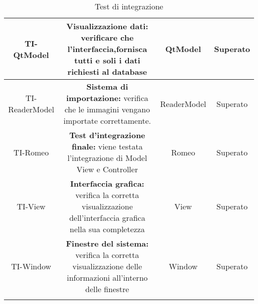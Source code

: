 \begin{center}
\begin{longtable}{|c|c|c|c|}
\hline
TI-QtModel & \parbox[t]{\larghezza}{\textbf{Visualizzazione dati:} verificare che l'interfaccia,fornisca tutti e soli i dati richiesti al database}  & QtModel & Superato \\ 
\hline
TI-ReaderModel & \parbox[t]{\larghezza}{\textbf{Sistema di importazione:} verifica che le immagini vengano importate correttamente.}  & ReaderModel & Superato \\ 
\hline
TI-Romeo & \parbox[t]{\larghezza}{\textbf {Test d'integrazione finale:} viene testata l'integrazione di Model View e Controller}  & Romeo & Superato \\ 
\hline
TI-View & \parbox[t]{\larghezza}{\textbf {Interfaccia grafica:} verifica la corretta visualizzazione dell'interfaccia grafica nella sua completezza}  & View & Superato \\ 
\hline
TI-Window & \parbox[t]{\larghezza}{\textbf {Finestre del sistema:} verifica la corretta visualizzazione delle informazioni all'interno delle finestre }  & Window & Superato \\ 
\hline
\caption{Test di integrazione}
\end{longtable}
\end{center}
